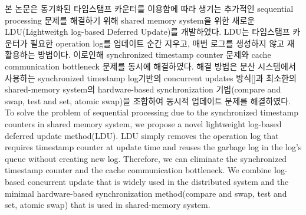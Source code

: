 %
\ifkor
본 논문은 동기화된 타임스탬프 카운터를 이용함에 따라 생기는 추가적인 sequential processing 문제를
해결하기 위해 shared memory system을 위한 새로운 LDU(Lightweitgh log-based Deferred Update)를
개발하였다.
LDU는 타임스탬프 카운터가 필요한 operation log를 업데이트 순간 지우고, 매번 로그를 생성하지 않고 재활용하는 방법이다.
이로인해 synchronized timestamp counter 문제와 cache communication bottleneck 문제를 동시에
해결하였다.
해결 방법은 분산 시스템에서 사용하는 synchronized timestamp log기반의 concurrent updates 방식[]과
최소한의 shared-memory system의 hardware-based synchronization 기법(compare and swap,
test and set, atomic swap)을 조합하여 동시적 업데이트 문제를 해결하였다.
\else
To solve the problem of sequential processing due to the synchronized timestamp
counters in shared memory system, we propose a novel lightweight log-based
deferred update method(LDU).
LDU simply removes the operation log that requires timestamp counter at
update time and reuses the garbage log in the log's queue without creating new
log.
Therefore, we can eliminate the synchronized timestamp counter and the cache
communication bottleneck.
We combine log-based concurrent update that is widely used in
the distributed system and the minimal hardware-based synchronization
method(compare and swap, test and set, atomic swap) that is used in shared-memory system.
\fi

